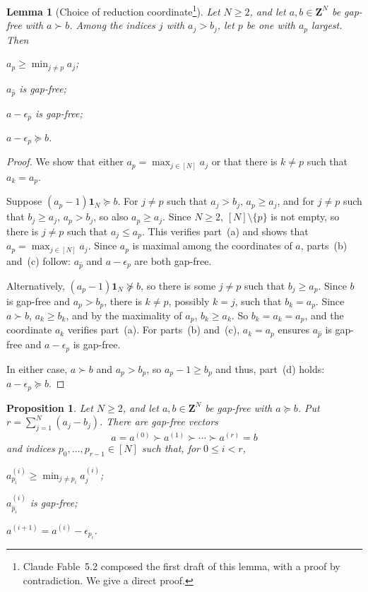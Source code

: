 \documentclass[12pt]{amsart}
\newtheorem{proposition}[theorem]{Proposition}
\newtheorem{lemma}[theorem]{Lemma}
\theoremstyle{definition}
\theoremstyle{remark}
\def\what{\hat}
\newcommand{\Z}{\mathbf Z}
\newcommand{\One}{\mathbf{1}}
\begin{document}
\begin{lemma}[Choice of reduction coordinate\footnote{\label{ft:fable}
Claude Fable~5.2 composed the first draft of this lemma, with a proof by contradiction.  We give a direct proof.}]\label{lem:choice-gf}
Let $N\ge2$, and let $a,b\in\Z^N$ be gap-free with $a \succ b$.  
Among the indices $j$ with $a_j>b_j$, let $p$ be
one with $a_p$ largest.  Then
\begin{thmlist}
\item\label{it:choicemin} $a_p\ge\min_{j\ne p}a_j$;
\item\label{it:choicedel} $a_{\what p}$ is gap-free;
\item\label{it:choicestep} $a-\epsilon_p$ is gap-free;
\item\label{it:goodstep} $a-\epsilon_p \succeq b$.
\end{thmlist}
\end{lemma}

\begin{proof}
We show that either $a_p = \max_{j\in[N]} a_j$ or that there is $k \neq p$
such that $a_k = a_p$.

Suppose $(a_p - 1)\One_N \succeq b$.  For $j\neq p$ such that $a_j > b_j$, $a_p \geq a_j$, and for $j\neq p$ such that $b_j \geq a_j$, $a_p > b_j$, so also $a_p \geq a_j$.
Since $N \geq 2$, $[N] \setminus \{p\}$ is not empty, so there is $j \neq p$ such that
$a_j \leq a_p$. This verifies part~(a) and shows that $a_p = \max_{j\in[N]} a_j$.  
Since $a_p$ is maximal among the coordinates of $a$, parts~(b) and~(c) follow: $a_{\what p}$ and $a - \epsilon_p$ are both gap-free.

Alternatively, $(a_p - 1)\One_N \not\succeq b$, so there is some $j \neq p$
such that $b_j \geq a_p$.  Since $b$ is gap-free and $a_p > b_p$, there is $k \neq p$,
possibly $k = j$, such that $b_k =  a_p$.  Since $a \succ b$, $a_k \geq b_k$, and by the
maximality of $a_p$, $b_k \geq a_k$.  So $b_k = a_k = a_p$, and
the coordinate $a_k$ verifies part~(a).  For parts~(b) and~(c), 
$a_k = a_p$ ensures
$a_{\what p}$ is gap-free and $a - \epsilon_p$ is gap-free.

In either case, $a \succ b$ and $a_p > b_p$, so $a_p-1 \geq b_p$ and thus, 
part~(d) holds: $a - \epsilon_p \succeq b$.
\end{proof}


\begin{proposition}\label{prop:chain-gf}
Let $N\ge2$, and let $a,b\in\Z^N$ be gap-free with $a\succeq b$.
Put $r=\sum_{j=1}^N(a_j-b_j)$.  There are gap-free vectors
\[
a=a^{(0)}\succ a^{(1)}\succ\cdots\succ a^{(r)}=b
\]
and indices $p_0,\ldots,p_{r-1}\in[N]$ such that, for $0\le i<r$,
\begin{thmlist}
\item\label{it:chainmin} $a^{(i)}_{p_i}\ge\min_{j\ne p_i}a^{(i)}_j$;
\item\label{it:chaindel} $a^{(i)}_{\what p_i}$ is gap-free;
\item\label{it:chainstep} $a^{(i+1)}=a^{(i)}-\epsilon_{p_i}$.
\end{thmlist}
\end{proposition}
\end{document}
